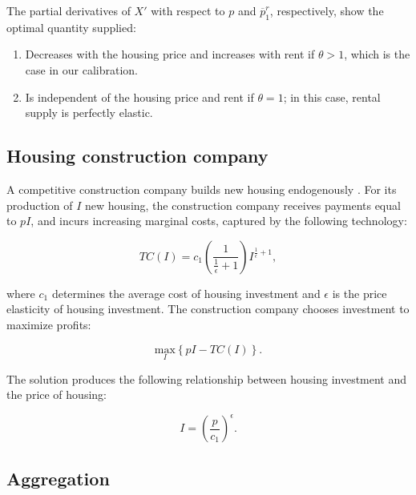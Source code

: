 \documentclass[parskip=full]{article}
\begin{document}
\noindent The partial derivatives of $X'$ with respect to $p$ and $\overline{p}^{r}_{1}$, respectively, show the optimal quantity supplied:

\begin{enumerate}
    \item Decreases with the housing price and increases with rent if $\theta>1$, which is the case in our calibration.
    \item Is independent of the housing price and rent if $\theta=1$; in this case, rental supply is perfectly elastic.
\end{enumerate}

\subsection{Housing construction company}

A competitive construction company builds new housing endogenously \citep{rotberg-2022}. For its production of $I$ new housing, the construction company receives payments equal to $pI$, and incurs increasing marginal costs, captured by the following technology:

\begin{equation*}
TC(I)=c_{1}\left(\frac{1}{\frac{1}{\epsilon}+1}\right)I^{\frac{1}{\epsilon}+1}\label{eq:total_cost_structure},
\end{equation*}

\noindent where $c_1$ determines the average cost of housing investment and $\epsilon$ is the price elasticity of housing investment. The construction company chooses investment to maximize profits:

\begin{equation*}
\label{eq:construction_company_profits}
\underset{I} {\text{$\mbox{max} $}}{\left\{p I-TC(I)\right\}}.
\end{equation*}

\noindent The solution produces the following relationship between housing investment and the price of housing:

\begin{equation}
\label{eq:construction_company_first_order_condition}
I=\left(\frac{p}{c_{1}}\right)^{\epsilon}.
\end{equation}

\subsection{Aggregation}\label{subsection:aggregation}
\end{document}
